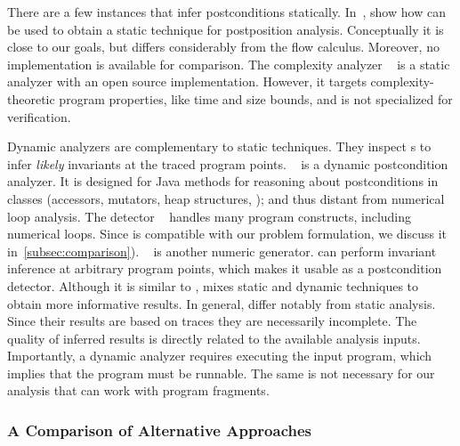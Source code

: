 There are a few instances that infer postconditions statically.
In~\cite{popeea2006}, show how  can be used to obtain a static technique for postposition analysis.
Conceptually it is close to our goals, but  differs considerably from the flow calculus.
Moreover, no implementation is available for comparison.
The complexity analyzer ~\cite{giesl2022} is a static analyzer with an open source implementation.
However, it targets complexity-theoretic program properties, like time and size bounds, and is not specialized for verification.

Dynamic analyzers are complementary to static techniques.
They inspect s to infer \emph{likely} invariants at the traced program points.
~\cite{molina2021} is a dynamic postcondition analyzer.
It is designed for Java methods for reasoning about postconditions in classes (accessors, mutators, heap structures, \etc);
and thus distant from numerical loop analysis.
The  detector ~\cite{ernst2007} handles many program constructs, including numerical loops.
Since  is compatible with our problem formulation, we discuss it in~\autoref{subsec:comparison}).
~\cite{nguyen2014} is another numeric  generator.
 can perform invariant inference at arbitrary program points, which makes it usable as a postcondition detector.
Although it is similar to ,  mixes static and dynamic techniques to obtain more informative results.
In general,  differ notably from static analysis.
Since their results are based on traces they are necessarily incomplete.
The quality of inferred results is directly related to the available analysis inputs.
Importantly, a dynamic analyzer requires executing the input program, which implies that the program must be runnable.
The same is not necessary for our analysis that can work with program fragments.

\subsubsection{A Comparison of Alternative Approaches}
\label{subsec:comparison}

